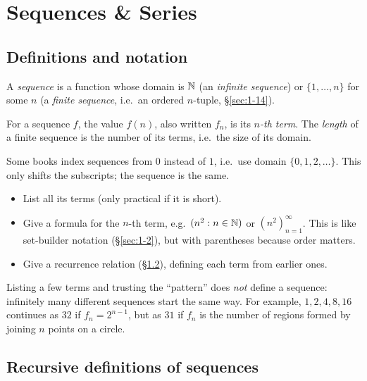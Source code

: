 \newpage
\section{Sequences \& Series}

\subsection{Definitions and notation}
\label{sec:6-1}

\begin{definition}[Sequence]
A \emph{sequence} is a function whose domain is $\mathbb{N}$ (an \emph{infinite sequence}) or $\{1,\dots,n\}$ for some $n$ (a \emph{finite sequence}, i.e.\ an ordered $n$-tuple, \S\ref{sec:1-14}).
\end{definition}

\begin{definition}
For a sequence $f$, the value $f(n)$, also written $f_n$, is its \emph{$n$-th term}. The \emph{length} of a finite sequence is the number of its terms, i.e.\ the size of its domain.
\end{definition}

\begin{note}
Some books index sequences from $0$ instead of $1$, i.e.\ use domain $\{0,1,2,\dots\}$. This only shifts the subscripts; the sequence is the same.
\end{note}

\begin{note}
\begin{itemize}
    \item List all its terms (only practical if it is short).
    \item Give a formula for the $n$-th term, e.g.\ $(n^2 : n\in\mathbb{N})$ or $(n^2)_{n=1}^{\infty}$. This is like set-builder notation (\S\ref{sec:1-2}), but with parentheses because order matters.
    \item Give a recurrence relation (\S\ref{sec:6-2}), defining each term from earlier ones.
\end{itemize}
Listing a few terms and trusting the ``pattern'' does \emph{not} define a sequence: infinitely many different sequences start the same way. For example, $1,2,4,8,16$ continues as $32$ if $f_n=2^{n-1}$, but as $31$ if $f_n$ is the number of regions formed by joining $n$ points on a circle.
\end{note}

\subsection{Recursive definitions of sequences}
\label{sec:6-2}

